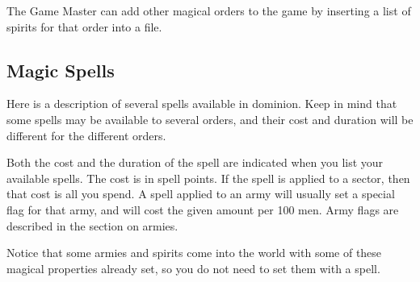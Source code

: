 The Game Master can add other magical orders to the game by inserting
a list of spirits for that order into a file.

\subsection{Magic Spells}

Here is a description of several spells available in dominion.  Keep
in mind that some spells may be available to several orders, and their
cost and duration will be different for the different orders.

Both the cost and the duration of the spell are indicated when you
list your available spells.  The cost is in spell points.  If the
spell is applied to a sector, then that cost is all you spend.  A
spell applied to an army will usually set a special flag for that
army, and will cost the given amount per 100 men.  Army flags are
described in the section on armies.

Notice that some armies and spirits come into the world with some of
these magical properties already set, so you do not need to set them
with a spell.

